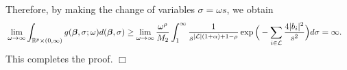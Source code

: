 \documentclass[12pt]{article}
\def\si{{\sigma}}
\def\al{{\alpha}}
\def\si{{\sigma}}
\def\om{{\omega}}
\def\non{{\nonumber}}
\def\Lc{{\cal L}}
\def\al{{\alpha}}
\def\si{{\sigma}}
\def\om{{\omega}}
\def\bbe{{\text{\boldmath $\beta$}}}
\def\Lc{{\cal L}}
\def\non{{\nonumber}}
\begin{document}
Therefore, by making the change of variables $\si = \om s$, we obtain 
\begin{align}
&\lim_{\om \to \infty } \int_{\mathbb{R} ^p \times (0, \infty )} g( \bbe , \si ; \om ) d( \bbe , \si ) \ge \lim_{\om \to \infty } {\om ^{\rho } \over M_2} \int_{1}^{\infty } {1 \over s^{| \Lc | (1 + \al ) + 1 - \rho }} \exp \Big( - \sum_{i \in \Lc } {4 | b_i |^2 \over s^2} \Big) d\si = \infty \text{.} \non 
\end{align}
This completes the proof. 
\hfill$\Box$
\end{document}
